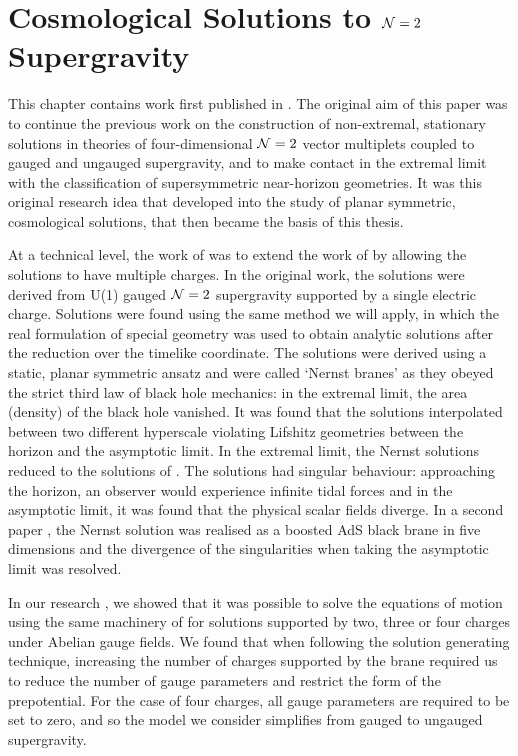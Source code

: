 \chapter[Cosmological Solutions of \titleN$=2$ Supergravity]{Cosmological Solutions to ${\cal N}=2$ Supergravity}
\label{ch:planarstu}

This chapter contains work first published in \cite{Gutowski:2019iyo}. The original aim of this paper was to continue the previous work \cite{Dempster:2015, Mohaupt:2011aa, Errington:2014bta, Dempster:2016} on the construction of non-extremal, stationary solutions in theories of four-dimensional ${\cal N}=2$ vector multiplets coupled to gauged and ungauged supergravity, and to make contact in the extremal limit with the classification of supersymmetric near-horizon geometries. It was this original research idea that developed into the study of planar symmetric, cosmological solutions, that  then became the basis of this thesis. 

At a technical level, the work of \cite{Gutowski:2019iyo} was to extend the work of \cite{Dempster:2015} by allowing the solutions to have multiple charges. In the original work, the solutions were derived from U(1) gauged ${\cal N} = 2$ supergravity supported by a single electric charge. Solutions were found using the same method we will apply, in which the real formulation of special geometry was used to obtain analytic solutions after the reduction over the timelike coordinate. The solutions were derived using a static, planar symmetric ansatz and were called `Nernst branes' as they obeyed the strict third law of black hole mechanics: in the extremal limit, the area (density) of the black hole vanished. It was found that the solutions interpolated between two different hyperscale violating Lifshitz geometries between the horizon and the asymptotic limit. In the extremal limit, the Nernst solutions reduced to the solutions of \cite{Barisch:2011ui, Cardoso:2015wcf}. The solutions had singular behaviour: approaching the horizon, an observer would experience infinite tidal forces and in the asymptotic limit, it was found that the physical scalar fields diverge. In a second paper \cite{Dempster:2016}, the Nernst solution was realised as a boosted AdS \sch black brane in five dimensions and the divergence of the singularities when taking the asymptotic limit was resolved.

In our research \cite{Gutowski:2019iyo}, we showed that it was possible to solve the equations of motion using the same machinery of \cite{Dempster:2015} for solutions supported by two, three or four charges under Abelian gauge fields. We found that when following the solution generating technique, increasing the number of charges supported by the brane required us to reduce the number of gauge parameters and restrict the form of the prepotential. For the case of four charges, all gauge parameters are required to be set to zero, and so the model we consider simplifies from gauged to ungauged supergravity. 

